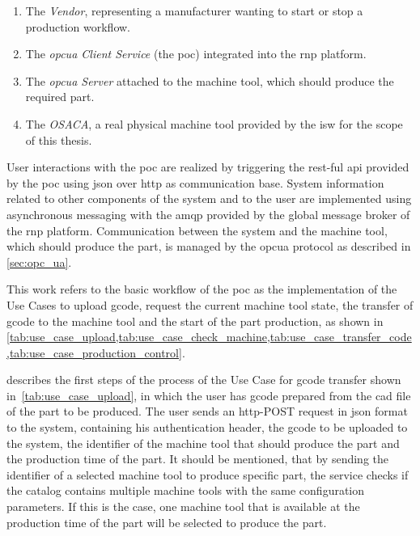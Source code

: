 \documentclass[
a4paper,
twoside,
headsepline,
cleardoublepage=empty,
parskip=half,
draft=false
]{scrbook}
\begin{document}
				\begin{enumerate}
					
					\item The \textit{Vendor}, representing a manufacturer wanting to start or stop a production workflow.
					
					\item The \textit{\gls{opcua} Client Service} (the \gls{poc}) integrated into the \gls{rnp} platform.
					
					\item The \textit{\gls{opcua} Server} attached to the machine tool, which should produce the required part.
					
					\item The \textit{OSACA}, a real physical machine tool provided by the \gls{isw} for the scope of this thesis.
					
				\end{enumerate}
				
				User interactions with the \gls{poc} are realized by triggering the \gls{rest}-ful \gls{api} provided by the \gls{poc} using \gls{json} over \gls{http} as communication base.
				System information related to other components of the system and to the user are implemented using asynchronous messaging with the \gls{amqp} provided by the global message broker of the \gls{rnp} platform.
				Communication between the system and the machine tool, which should produce the part, is managed by the \gls{opcua} protocol as described in \cref{sec:opc_ua}.
				
				This work refers to the basic workflow of the \gls{poc} as the implementation of the Use Cases to upload \gls{gcode}, request the current machine tool state, the transfer of \gls{gcode} to the machine tool and the start of the part production, as shown in \cref{tab:use_case_upload,tab:use_case_check_machine,tab:use_case_transfer_code,tab:use_case_production_control}.

				 describes the first steps of the process of the Use Case for \gls{gcode} transfer shown in~\cref{tab:use_case_upload}, in which the user has \gls{gcode} prepared from the \gls{cad} file of the part to be produced. The user sends an \gls{http}-POST request in \gls{json} format to the system, containing his authentication header, the \gls{gcode} to be uploaded to the system, the identifier of the machine tool that should produce the part and the production time of the part. It should be mentioned, that by sending the identifier of a selected machine tool to produce specific part, the service checks if the catalog contains multiple machine tools with the same configuration parameters. If this is the case, one machine tool that is available at the production time of the part will be selected to produce the part.
\end{document}
